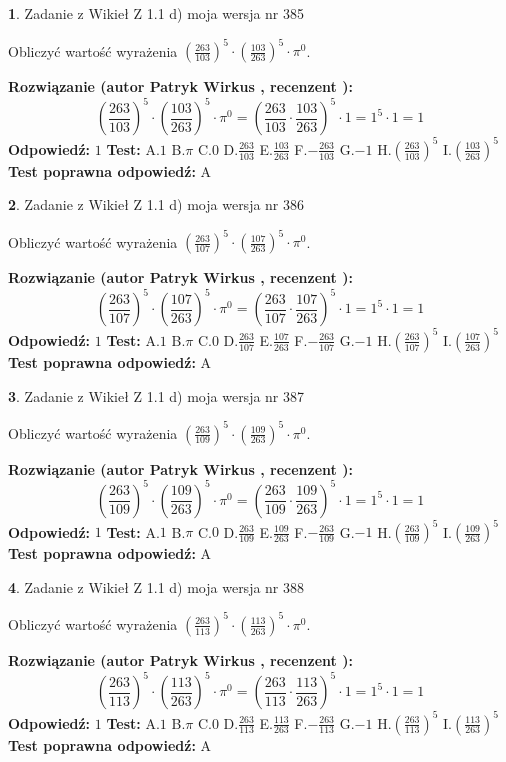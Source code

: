 \documentclass[12pt, a4paper]{article}
\theoremstyle{definition} %
\newtheorem{zad}{}
\newcommand{\zadStart}[1]{\begin{zad}#1\newline}
\newcommand{\zadStop}{\end{zad}}
\newcommand{\rozwStart}[2]{\noindent \textbf{Rozwiązanie (autor #1 , recenzent #2): }\newline}
\newcommand{\rozwStop}{\newline}
\newcommand{\odpStart}{\noindent \textbf{Odpowiedź:}\newline}
\newcommand{\odpStop}{\newline}
\newcommand{\testStart}{\noindent \textbf{Test:}\newline}
\newcommand{\testStop}{\newline}
\newcommand{\kluczStart}{\noindent \textbf{Test poprawna odpowiedź:}\newline}
\newcommand{\kluczStop}{\newline}
\begin{document}
\zadStart{Zadanie z Wikieł Z 1.1 d) moja wersja nr 385}

Obliczyć wartość wyrażenia $(\frac{263}{103})^{5} \cdot (\frac{103}{263})^{5} \cdot \pi^{0}$.
\zadStop
\rozwStart{Patryk Wirkus}{}
$$(\frac{263}{103})^{5} \cdot (\frac{103}{263})^{5} \cdot \pi^{0} = (\frac{263}{103} \cdot \frac{103}{263})^{5} \cdot 1 = 1^{5} \cdot 1 = 1$$
\rozwStop
\odpStart
$1$
\odpStop
\testStart
A.$1$ B.$\pi$ C.$0$ D.$\frac{263}{103}$ E.$\frac{103}{263}$
F.$-\frac{263}{103}$ G.$-1$
H.$(\frac{263}{103})^{5}$
I.$(\frac{103}{263})^{5}$
\testStop
\kluczStart
A
\kluczStop



\zadStart{Zadanie z Wikieł Z 1.1 d) moja wersja nr 386}

Obliczyć wartość wyrażenia $(\frac{263}{107})^{5} \cdot (\frac{107}{263})^{5} \cdot \pi^{0}$.
\zadStop
\rozwStart{Patryk Wirkus}{}
$$(\frac{263}{107})^{5} \cdot (\frac{107}{263})^{5} \cdot \pi^{0} = (\frac{263}{107} \cdot \frac{107}{263})^{5} \cdot 1 = 1^{5} \cdot 1 = 1$$
\rozwStop
\odpStart
$1$
\odpStop
\testStart
A.$1$ B.$\pi$ C.$0$ D.$\frac{263}{107}$ E.$\frac{107}{263}$
F.$-\frac{263}{107}$ G.$-1$
H.$(\frac{263}{107})^{5}$
I.$(\frac{107}{263})^{5}$
\testStop
\kluczStart
A
\kluczStop



\zadStart{Zadanie z Wikieł Z 1.1 d) moja wersja nr 387}

Obliczyć wartość wyrażenia $(\frac{263}{109})^{5} \cdot (\frac{109}{263})^{5} \cdot \pi^{0}$.
\zadStop
\rozwStart{Patryk Wirkus}{}
$$(\frac{263}{109})^{5} \cdot (\frac{109}{263})^{5} \cdot \pi^{0} = (\frac{263}{109} \cdot \frac{109}{263})^{5} \cdot 1 = 1^{5} \cdot 1 = 1$$
\rozwStop
\odpStart
$1$
\odpStop
\testStart
A.$1$ B.$\pi$ C.$0$ D.$\frac{263}{109}$ E.$\frac{109}{263}$
F.$-\frac{263}{109}$ G.$-1$
H.$(\frac{263}{109})^{5}$
I.$(\frac{109}{263})^{5}$
\testStop
\kluczStart
A
\kluczStop



\zadStart{Zadanie z Wikieł Z 1.1 d) moja wersja nr 388}

Obliczyć wartość wyrażenia $(\frac{263}{113})^{5} \cdot (\frac{113}{263})^{5} \cdot \pi^{0}$.
\zadStop
\rozwStart{Patryk Wirkus}{}
$$(\frac{263}{113})^{5} \cdot (\frac{113}{263})^{5} \cdot \pi^{0} = (\frac{263}{113} \cdot \frac{113}{263})^{5} \cdot 1 = 1^{5} \cdot 1 = 1$$
\rozwStop
\odpStart
$1$
\odpStop
\testStart
A.$1$ B.$\pi$ C.$0$ D.$\frac{263}{113}$ E.$\frac{113}{263}$
F.$-\frac{263}{113}$ G.$-1$
H.$(\frac{263}{113})^{5}$
I.$(\frac{113}{263})^{5}$
\testStop
\kluczStart
A
\kluczStop
\end{document}
